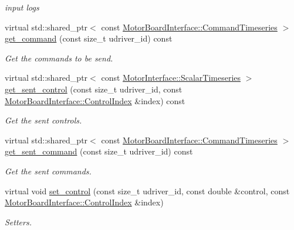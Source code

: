 \begin{DoxyCompactItemize}
\begin{DoxyCompactList}\small\item\em input logs \end{DoxyCompactList}\item 
virtual std\+::shared\+\_\+ptr$<$ const \hyperlink{classblmc__drivers_1_1MotorBoardInterface_ae2afe94a023d9f08a4c689e9b7660f15}{Motor\+Board\+Interface\+::\+Command\+Timeseries} $>$ \hyperlink{classblmc__drivers_1_1SpiBus_ae6a1f926abf8232f468db4fde35a8f68}{get\+\_\+command} (const size\+\_\+t udriver\+\_\+id) const 
\begin{DoxyCompactList}\small\item\em Get the commands to be send. \end{DoxyCompactList}\item 
virtual std\+::shared\+\_\+ptr$<$ const \hyperlink{classblmc__drivers_1_1MotorInterface_a49b8fc916b9f9debbd7b0988463db5cd}{Motor\+Interface\+::\+Scalar\+Timeseries} $>$ \hyperlink{classblmc__drivers_1_1SpiBus_a7ad1599bdccf5a044b532252951ef774}{get\+\_\+sent\+\_\+control} (const size\+\_\+t udriver\+\_\+id, const \hyperlink{classblmc__drivers_1_1MotorBoardInterface_a82ed4d0fa527521707281396095a88ca}{Motor\+Board\+Interface\+::\+Control\+Index} \&index) const 
\begin{DoxyCompactList}\small\item\em Get the sent controls. \end{DoxyCompactList}\item 
virtual std\+::shared\+\_\+ptr$<$ const \hyperlink{classblmc__drivers_1_1MotorBoardInterface_ae2afe94a023d9f08a4c689e9b7660f15}{Motor\+Board\+Interface\+::\+Command\+Timeseries} $>$ \hyperlink{classblmc__drivers_1_1SpiBus_ad869c7ebcb9c1f028e8ed6afcf20f982}{get\+\_\+sent\+\_\+command} (const size\+\_\+t udriver\+\_\+id) const 
\begin{DoxyCompactList}\small\item\em Get the sent commands. \end{DoxyCompactList}\item 
virtual void \hyperlink{classblmc__drivers_1_1SpiBus_a9cf14c27b226c454795cc1e508ae9a2f}{set\+\_\+control} (const size\+\_\+t udriver\+\_\+id, const double \&control, const \hyperlink{classblmc__drivers_1_1MotorBoardInterface_a82ed4d0fa527521707281396095a88ca}{Motor\+Board\+Interface\+::\+Control\+Index} \&index)
\begin{DoxyCompactList}\small\item\em Setters. \end{DoxyCompactList}\item 

\end{DoxyCompactItemize}
